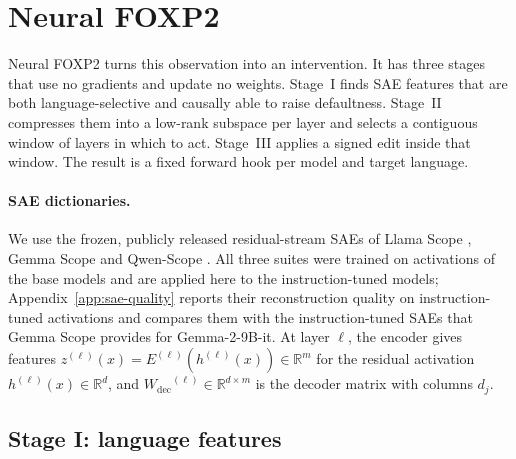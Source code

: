 \documentclass[11pt]{article}
\newcommand{\foxp}{Neural FOXP2\xspace}
\newcommand{\Wdec}{\ensuremath{W_{\mathrm{dec}}}}
\begin{document}
\section{\foxp}
\label{sec:method}

\foxp turns this observation into an intervention. It has three stages that use no gradients and update no weights. Stage~I finds SAE features that are both language-selective and causally able to raise defaultness. Stage~II compresses them into a low-rank subspace per layer and selects a contiguous window of layers in which to act. Stage~III applies a signed edit inside that window. The result is a fixed forward hook per model and target language.

\paragraph{SAE dictionaries.}
We use the frozen, publicly released residual-stream SAEs of Llama Scope \citep{he2024llamascopeextractingmillions}, Gemma Scope \citep{lieberum2024gemmascopeopensparse} and Qwen-Scope \citep{deng2026qwenscopeturningsparsefeatures}. All three suites were trained on activations of the base models and are applied here to the instruction-tuned models; Appendix~\ref{app:sae-quality} reports their reconstruction quality on instruction-tuned activations and compares them with the instruction-tuned SAEs that Gemma Scope provides for Gemma-2-9B-it. At layer $\ell$, the encoder gives features $z^{(\ell)}(x)=E^{(\ell)}(h^{(\ell)}(x))\in\mathbb{R}^m$ for the residual activation $h^{(\ell)}(x)\in\mathbb{R}^d$, and $\Wdec^{(\ell)}\in\mathbb{R}^{d\times m}$ is the decoder matrix with columns $d_j$.

\subsection{Stage I: language features}
\label{subsec:stage1}
\end{document}
